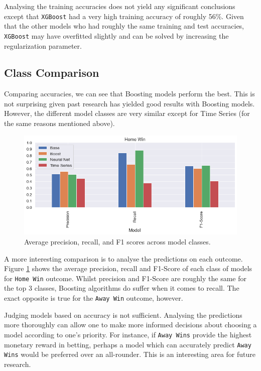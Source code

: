 \documentclass{article}
\newcommand{\sw}[1]{\texttt{#1}}
\begin{document}
Analysing the training accuracies does not yield any significant conclusions except that \sw{XGBoost} had a very high training accuracy of roughly 56\%. Given that the other models who had roughly the same training and test accuracies, \sw{XGBoost} may have overfitted slightly and can be solved by increasing the regularization parameter. 

\subsection{Class Comparison} 
\label{classcomparison}

Comparing accuracies, we can see that Boosting models perform the best. This is not surprising given past research has yielded good results with Boosting models. However, the different model classes are very similar except for Time Series (for the same reasons mentioned above).

\begin{figure}[!htb]
    \centering
    \includegraphics[width=0.7\linewidth]{Images/Figure 7.png}
    \caption{Average precision, recall, and F1 scores across model classes.}
    \label{fig:modelcomparisons}
\end{figure}

A more interesting comparison is to analyse the predictions on each outcome. Figure \ref{fig:modelcomparisons} shows the average precision, recall and F1-Score of each class of models for \sw{Home Win} outcome. Whilst precision and F1-Score are roughly the same for the top 3 classes, Boosting algorithms do suffer when it comes to recall. The exact opposite is true for the \sw{Away Win} outcome, however.  

Judging models based on accuracy is not sufficient. Analysing the predictions more thoroughly can allow one to make more informed decisions about choosing a model according to one’s priority. For instance, if \sw{Away Wins} provide the highest monetary reward in betting, perhaps a model which can accurately predict \sw{Away Wins} would be preferred over an all-rounder. This is an interesting area for future research.  
\end{document}
